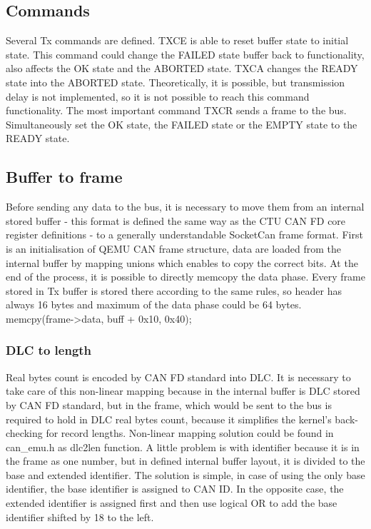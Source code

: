 \documentclass{ctuthesis}
\begin{document}
 \subsection{Commands}
  Several Tx commands are defined. TXCE is able to reset buffer state to initial state. This command could change the FAILED state buffer back to functionality, also affects the OK state and the ABORTED state. TXCA changes the READY state into the ABORTED state. Theoretically, it is possible, but transmission delay is not implemented, so it is not possible to reach this command functionality. The most important command TXCR sends a frame to the bus. Simultaneously set the OK state, the FAILED state or the EMPTY state to the READY state.
 
 \subsection{Buffer to frame}
  Before sending any data to the bus, it is necessary to move them from an internal stored buffer - this format is defined the same way as the CTU CAN FD core register definitions - to a generally understandable SocketCan frame format. First is an initialisation of QEMU CAN frame structure, data are loaded from the internal buffer by mapping unions which enables to copy the correct bits. At the end of the process, it is possible to directly memcopy the data phase. Every frame stored in Tx buffer is stored there according to the same rules, so header has always 16 bytes and maximum of the data phase could be 64 bytes.
  memcpy(frame->data, buff + 0x10, 0x40);
 
  \subsubsection{DLC to length}
   Real bytes count is encoded by CAN FD standard into DLC. It is necessary to take care of this non-linear mapping because in the internal buffer is DLC stored by CAN FD standard, but in the frame, which would be sent to the bus is required to hold in DLC real bytes count, because it simplifies the kernel's back-checking for record lengths. Non-linear mapping solution could be found in can\_emu.h as dlc2len function. A little problem is with identifier because it is in the frame as one number, but in defined internal buffer layout, it is divided to the base and extended identifier. The solution is simple, in case of using the only base identifier, the base identifier is assigned to CAN ID. In the opposite case, the extended identifier is assigned first and then use logical OR to add the base identifier shifted by 18 to the left. 
   
\end{document}
